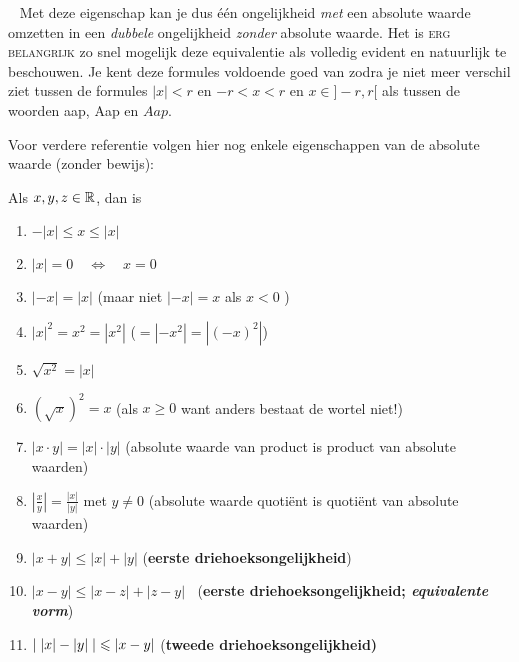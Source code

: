 \documentclass{ximera}
\begin{document}

\begin{remark} \  %
		Met deze eigenschap kan je dus één ongelijkheid \textit{met} een absolute waarde omzetten in een \textit{dubbele} ongelijkheid \textit{zonder} absolute waarde. Het is \textsc{erg belangrijk} zo snel mogelijk deze equivalentie als volledig evident en natuurlijk te beschouwen. Je kent deze formules voldoende goed van zodra je niet meer verschil ziet tussen de formules $|x|<r$ en $-r<x<r$ en $x\in]-r,r[$ als tussen de woorden aap, Aap en $Aap$.
\end{remark}

Voor verdere referentie volgen hier nog enkele eigenschappen van de absolute waarde
(zonder bewijs):
\begin{proposition}\label{eig: aw}
	Als $x,y,z\in \mathbb{R}$, dan is
	\begin{enumerate}
		\item \label{aw tss}$-|x| \leqslant x \leqslant |x|$ 
		\item \label{aw 0}$|x|=0 \quad\Leftrightarrow \quad x=0$ 
		\item \label{aw x -x} $|-x|=|x|$ \hfill (maar niet $|-x|=x$ als $x<0$ )
		\item \label{aw kwadr}$|x|^2=x^2=|x^2|$ \hfill ($=|-x^2| = |(-x)^2|$)
		\item \label{wortel	kwadr}$\sqrt{x^2}=|x|$
		\item \label{kwadr wortel}$(\sqrt{x})^2=x$ \hfill(als $x \geq 0$
			want anders bestaat de wortel niet!)
		\item \label{aw product}$|x\cdot y|=|x|\cdot|y|$ \hfill(absolute waarde van product is product van absolute waarden)
		\item \label{aw	quotient}$\displaystyle \left|\frac{x}{y}\right|=\frac{|x|}{|y|}$
		met $y\neq 0$ \hfill(absolute waarde quotiënt is quotiënt van absolute waarden)
			

		\item \label{aw1edrieh}$|x+y| \leqslant|x|+|y|$ \hfill ({\bf eerste
			drie\-hoeks\-on\-ge\-lijk\-heid})
		\item \label{aw1e drieh2}$|x-y|
		\leqslant|x-z|+|z-y|\;\;$ \hfill ({\bf eerste
			drie\-hoeks\-on\-ge\-lijk\-heid;  \textit{equivalente vorm}})
		\item \label{aw 2e drieh} $\displaystyle |\;|x|-|y|\;| \leqslant|x-y|$ \hfill
		(\bf tweede driehoeksongelijkheid)
	\end{enumerate}
\end{proposition}
\end{document}
